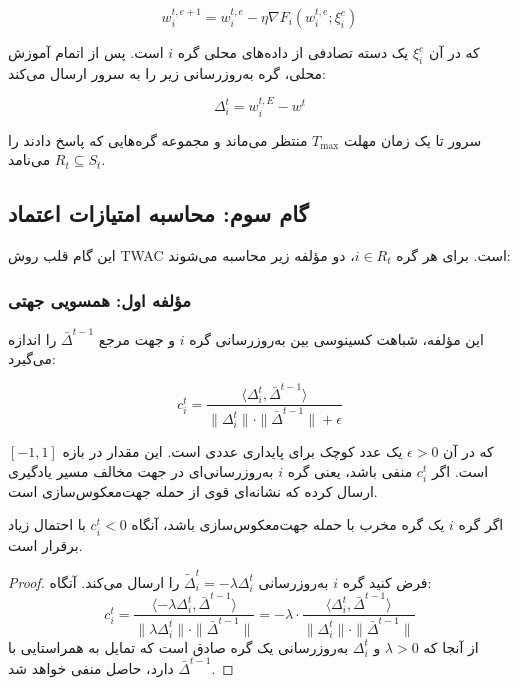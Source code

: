 \begin{equation}
    w_i^{t, e+1} = w_i^{t, e} - \eta \nabla F_i(w_i^{t, e}; \xi_i^e)
    \label{eq:local_update}
\end{equation}

که در آن $\xi_i^e$ یک دسته تصادفی از داده‌های محلی گره $i$ است. پس از اتمام آموزش محلی، گره به‌روزرسانی زیر را به سرور ارسال می‌کند:

\begin{equation}
    \Delta_i^t = w_i^{t, E} - w^t
    \label{eq:delta}
\end{equation}

سرور تا یک زمان مهلت $T_{\max}$ منتظر می‌ماند و مجموعه گره‌هایی که پاسخ دادند را $R_t \subseteq S_t$ می‌نامد.

\subsection{گام سوم: محاسبه امتیازات اعتماد}

این گام قلب روش \gls{TWAC} است. برای هر گره $i \in R_t$، دو مؤلفه زیر محاسبه می‌شوند:

\subsubsection{مؤلفه اول: همسویی جهتی}

این مؤلفه، شباهت کسینوسی بین به‌روزرسانی گره $i$ و جهت مرجع $\bar{\Delta}^{t-1}$ را اندازه می‌گیرد:

\begin{equation}
    c_i^t = \frac{\langle \Delta_i^t, \bar{\Delta}^{t-1} \rangle}{\|\Delta_i^t\| \cdot \|\bar{\Delta}^{t-1}\| + \epsilon}
    \label{eq:cosine}
\end{equation}

که در آن $\epsilon > 0$ یک عدد کوچک برای پایداری عددی است. این مقدار در بازه $[-1, 1]$ است. اگر $c_i^t$ منفی باشد، یعنی گره $i$ به‌روزرسانی‌ای در جهت مخالف مسیر یادگیری ارسال کرده که نشانه‌ای قوی از حمله جهت‌معکوس‌سازی است.

\begin{nttheorem}
\label{theorem:direction}
    اگر گره $i$ یک گره مخرب با حمله جهت‌معکوس‌سازی باشد، آنگاه $c_i^t < 0$ با احتمال زیاد برقرار است.
\end{nttheorem}

\begin{proof}
    فرض کنید گره $i$ به‌روزرسانی $\tilde{\Delta}_i^t = -\lambda \Delta_i^t$ را ارسال می‌کند. آنگاه:
    \begin{equation*}
        c_i^t = \frac{\langle -\lambda \Delta_i^t, \bar{\Delta}^{t-1} \rangle}{\|\lambda \Delta_i^t\| \cdot \|\bar{\Delta}^{t-1}\|} = -\lambda \cdot \frac{\langle \Delta_i^t, \bar{\Delta}^{t-1} \rangle}{\|\Delta_i^t\| \cdot \|\bar{\Delta}^{t-1}\|}
    \end{equation*}
    از آنجا که $\lambda > 0$ و $\Delta_i^t$ به‌روزرسانی یک گره صادق است که تمایل به همراستایی با $\bar{\Delta}^{t-1}$ دارد، حاصل منفی خواهد شد.
\end{proof}

